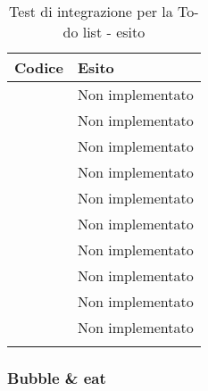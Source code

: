 \begin{longtable}{|c|c|}
	\hline \multicolumn{1}{|l|}{\textbf{Codice}} & \multicolumn{1}{l|}{\textbf{Esito}}
	\\
	\hline \testt{} & Non implementato\\
	\hline \testt{} & Non implementato\\
	\hline \testt{} & Non implementato\\
	\hline \testt{} & Non implementato\\
	\hline \testt{} & Non implementato\\
	\hline \testt{} & Non implementato\\
	\hline \testt{} & Non implementato\\
	\hline \testt{} & Non implementato\\
	\hline \testt{} & Non implementato\\
	\hline \testt{} & Non implementato\\
	\hline
	\caption{Test di integrazione per la To-do list - esito}
\end{longtable}

\subsubsection{Bubble \& eat}

